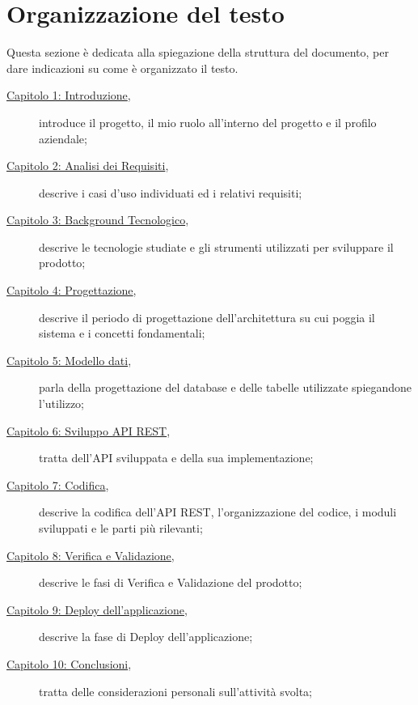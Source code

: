 \section{Organizzazione del testo}
Questa sezione è dedicata alla spiegazione della struttura del documento, per dare indicazioni su come è organizzato il testo.
\begin{description}

\item [{\hyperref[cap:introduzione]{Capitolo 1: Introduzione}},] introduce il progetto, il mio ruolo all'interno del progetto e il profilo aziendale;

    \item [{\hyperref[cap:analisi-requisiti]{Capitolo 2: Analisi dei Requisiti}},] descrive i casi d'uso individuati ed i relativi requisiti;
    
    \item[{\hyperref[cap:tecnologie]{Capitolo 3: Background Tecnologico}},] descrive le tecnologie studiate e gli strumenti utilizzati per sviluppare il prodotto;
    
    \item[{\hyperref[cap:progettazione]{Capitolo 4: Progettazione}},] descrive il periodo di progettazione dell'architettura su cui poggia il sistema e i concetti fondamentali;
    
    \item[{\hyperref[cap:database]{Capitolo 5: Modello dati}},] parla della progettazione del database e delle tabelle utilizzate spiegandone l'utilizzo;
    
    \item[{\hyperref[cap:api-rest]{Capitolo 6: Sviluppo API REST}},] tratta dell'API sviluppata e della sua implementazione;
    
    \item[{\hyperref[cap:codifica]{Capitolo 7: Codifica}},] descrive la codifica dell'API REST, l'organizzazione del codice, i moduli sviluppati e le parti più rilevanti;
    
    \item[{\hyperref[cap:verifica-validazione]{Capitolo 8: Verifica e Validazione}},] descrive le fasi di Verifica e Validazione del prodotto;
    
    \item[{\hyperref[cap:deploy]{Capitolo 9: Deploy dell'applicazione}},] descrive la fase di Deploy dell'applicazione;
    
    \item[{\hyperref[cap:conclusioni]{Capitolo 10: Conclusioni}},] tratta delle considerazioni personali sull'attività svolta;
    
\end{description}

